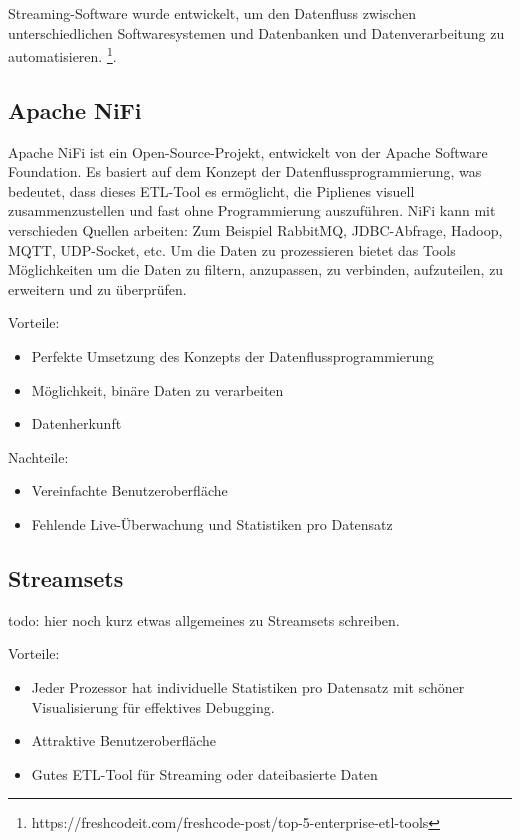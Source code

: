 Streaming-Software wurde entwickelt, um den Datenfluss zwischen unterschiedlichen Softwaresystemen und Datenbanken und Datenverarbeitung zu automatisieren. \footnote{\label{foot:1} https://freshcodeit.com/freshcode-post/top-5-enterprise-etl-tools}. 

\subsection{Apache NiFi}

Apache NiFi ist ein Open-Source-Projekt, entwickelt von der Apache Software Foundation. Es basiert auf dem Konzept der Datenflussprogrammierung, was bedeutet, dass dieses ETL-Tool es erm{\"o}glicht, die Piplienes visuell zusammenzustellen und fast ohne Programmierung auszuf{\"u}hren. NiFi kann mit verschieden Quellen arbeiten: Zum Beispiel RabbitMQ, JDBC-Abfrage, Hadoop, MQTT, UDP-Socket, etc. Um die Daten zu prozessieren bietet das Tools M{\"o}glichkeiten um die Daten zu filtern, anzupassen, zu verbinden, aufzuteilen, zu erweitern und zu {\"u}berpr{\"u}fen. 

Vorteile: 
\begin{itemize}
  \item Perfekte Umsetzung des Konzepts der Datenflussprogrammierung
  \item M{\"o}glichkeit, bin{\"a}re Daten zu verarbeiten
  \item Datenherkunft
\end{itemize}

Nachteile: 
\begin{itemize}
  \item Vereinfachte Benutzeroberfl{\"a}che 
  \item Fehlende Live-{\"U}berwachung und Statistiken pro Datensatz
\end{itemize}

\subsection{Streamsets}

todo: hier noch kurz etwas allgemeines zu Streamsets schreiben.

Vorteile: 
\begin{itemize}
  \item Jeder Prozessor hat individuelle Statistiken pro Datensatz mit sch{\"o}ner Visualisierung f{\"u}r effektives Debugging. 
  \item Attraktive Benutzeroberfl{\"a}che
  \item Gutes ETL-Tool f{\"u}r Streaming oder dateibasierte Daten
\end{itemize}

